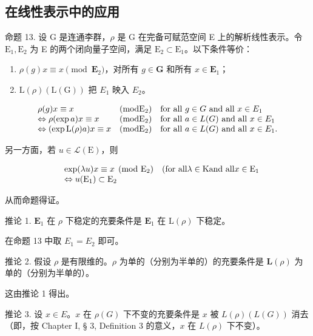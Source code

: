 \subsection{在线性表示中的应用}

命题 13. 设 G 是连通李群，\(\rho\) 是 G 在完备可赋范空间 E 上的解析线性表示。令 \(\mathrm{E}_1, \mathrm{E}_2\) 为 E 的两个闭向量子空间，满足 \(\mathrm{E}_2 \subset \mathrm{E}_1\)。以下条件等价：

\begin{enumerate}
\def\labelenumi{(\roman{enumi})}
\item
  \(\rho(g)x \equiv x \pmod{\mathbf{E}_2}\)，对所有 \(g \in \mathbf{G}\) 和所有 \(x \in \mathbf{E}_1\)；
\item
  \(\mathrm{L}(\rho)(\mathrm{L}(\mathrm{G}))\) 把 \(E_{1}\) 映入 \(E_{2}\)。
\end{enumerate}

\[
\begin{array}{l l l} \rho (g) x \equiv x & (\mathrm{mod} \mathrm{E} _ {2}) & \text {for all \(g\in G\) and all \(x\in E_{1}\)} \\ \Leftrightarrow \rho (\exp a) x \equiv x & (\mathrm{mod} \mathrm{E} _ {2}) & \text {for all \(a\in L(G)\) and all \(x\in E_{1}\)} \\ \Leftrightarrow (\exp \mathrm{L} (\rho) a) x \equiv x & (\mathrm{mod} \mathrm{E} _ {2}) & \text {for all \(a\in L(G)\) and all \(x\in E_{1}\)}. \end{array}
\]

另一方面，若 \(u \in \mathcal{L}(\mathrm{E})\)，则

\[
\begin{array}{r l} & \exp (\lambda u) x \equiv x \pmod {\mathrm{E} _ {2}} \quad \text {(for all} \lambda \in \mathrm{K} \text {and all} x \in \mathrm{E} _ {1} \\ & \Leftrightarrow u (\mathrm{E} _ {1}) \subset \mathrm{E} _ {2} \end{array}
\]

从而命题得证。

推论 1. \(\mathbf{E}_1\) 在 \(\rho\) 下稳定的充要条件是 \(\mathbf{E}_1\) 在 \(\mathrm{L}(\rho)\) 下稳定。

在命题 13 中取 \(E_{1} = E_{2}\) 即可。

推论 2. 假设 \(\rho\) 是有限维的。\(\rho\) 为单的（分别为半单的）的充要条件是 \(\mathbf{L}(\rho)\) 为单的（分别为半单的）。

这由推论 1 得出。

推论 3. 设 \(x \in E\)。\(x\) 在 \(\rho(G)\) 下不变的充要条件是 \(x\) 被 \(L(\rho)(L(G))\) 消去（即，按 Chapter I, § 3, Definition 3 的意义，\(x\) 在 \(L(\rho)\) 下不变）。

